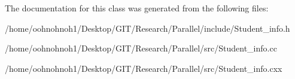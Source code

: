 The documentation for this class was generated from the following files\+:\begin{DoxyCompactItemize}
\item 
/home/oohnohnoh1/\+Desktop/\+G\+I\+T/\+Research/\+Parallel/include/Student\+\_\+info.\+h\item 
/home/oohnohnoh1/\+Desktop/\+G\+I\+T/\+Research/\+Parallel/src/Student\+\_\+info.\+cc\item 
/home/oohnohnoh1/\+Desktop/\+G\+I\+T/\+Research/\+Parallel/src/Student\+\_\+info.\+cxx\end{DoxyCompactItemize}
